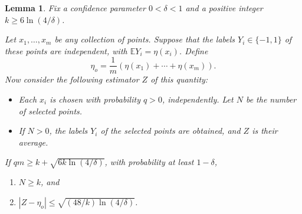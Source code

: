 \documentclass{article}
\def\E{{\mathbb E}}
\newtheorem{lemma}[thm]{Lemma}
\begin{document}
\begin{lemma}
Fix a confidence parameter $0 < \delta < 1$ and a positive integer $k \geq 6 \ln (4/\delta)$. 

Let $x_1, \ldots, x_m$ be any collection of points. Suppose that the labels $Y_i \in \{-1,1\}$ of these points are independent, with $\E Y_i = \eta(x_i)$. Define
$$ \eta_o = \frac{1}{m} \left( \eta(x_1) + \cdots + \eta(x_m) \right) .$$
Now consider the following estimator $Z$ of this quantity:
\begin{itemize}
\item Each $x_i$ is chosen with probability $q > 0$, independently. Let $N$ be the number of selected points.
\item If $N > 0$, the labels $Y_i$ of the selected points are obtained, and $Z$ is their average.
\end{itemize}
If $qm \geq k + \sqrt{6k \ln (4/\delta)}$, with probability at least $1-\delta$, 
\begin{enumerate}
\item[(a)] $N \geq k$, and 
\item[(b)] $| Z - \eta_o| \leq \sqrt{(48/k) \ln (4/\delta)}$.
\end{enumerate}
\label{lemma:large-deviation-discrete}
\end{lemma}
\end{document}
